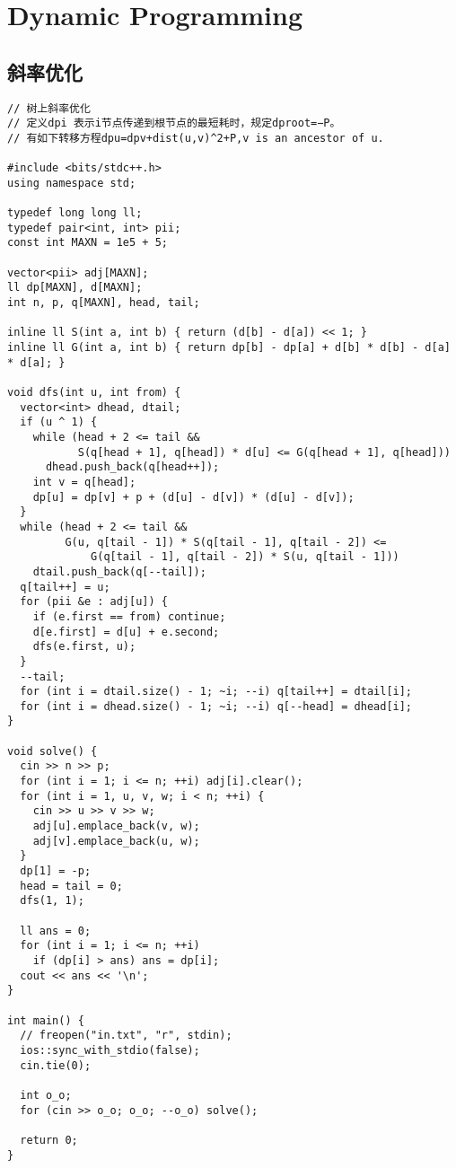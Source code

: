 \documentclass[twoside]{article}
\begin{document}
\section{Dynamic Programming}

\subsection{斜率优化}
\begin{lstlisting}
// 树上斜率优化
// 定义dpi 表示i节点传递到根节点的最短耗时，规定dproot=−P。
// 有如下转移方程dpu=dpv+dist(u,v)^2+P,v is an ancestor of u.

#include <bits/stdc++.h>
using namespace std;

typedef long long ll;
typedef pair<int, int> pii;
const int MAXN = 1e5 + 5;

vector<pii> adj[MAXN];
ll dp[MAXN], d[MAXN];
int n, p, q[MAXN], head, tail;

inline ll S(int a, int b) { return (d[b] - d[a]) << 1; }
inline ll G(int a, int b) { return dp[b] - dp[a] + d[b] * d[b] - d[a] * d[a]; }

void dfs(int u, int from) {
  vector<int> dhead, dtail;
  if (u ^ 1) {
    while (head + 2 <= tail &&
           S(q[head + 1], q[head]) * d[u] <= G(q[head + 1], q[head]))
      dhead.push_back(q[head++]);
    int v = q[head];
    dp[u] = dp[v] + p + (d[u] - d[v]) * (d[u] - d[v]);
  }
  while (head + 2 <= tail &&
         G(u, q[tail - 1]) * S(q[tail - 1], q[tail - 2]) <=
             G(q[tail - 1], q[tail - 2]) * S(u, q[tail - 1]))
    dtail.push_back(q[--tail]);
  q[tail++] = u;
  for (pii &e : adj[u]) {
    if (e.first == from) continue;
    d[e.first] = d[u] + e.second;
    dfs(e.first, u);
  }
  --tail;
  for (int i = dtail.size() - 1; ~i; --i) q[tail++] = dtail[i];
  for (int i = dhead.size() - 1; ~i; --i) q[--head] = dhead[i];
}

void solve() {
  cin >> n >> p;
  for (int i = 1; i <= n; ++i) adj[i].clear();
  for (int i = 1, u, v, w; i < n; ++i) {
    cin >> u >> v >> w;
    adj[u].emplace_back(v, w);
    adj[v].emplace_back(u, w);
  }
  dp[1] = -p;
  head = tail = 0;
  dfs(1, 1);

  ll ans = 0;
  for (int i = 1; i <= n; ++i)
    if (dp[i] > ans) ans = dp[i];
  cout << ans << '\n';
}

int main() {
  // freopen("in.txt", "r", stdin);
  ios::sync_with_stdio(false);
  cin.tie(0);

  int o_o;
  for (cin >> o_o; o_o; --o_o) solve();

  return 0;
}

\end{lstlisting}
\end{document}
